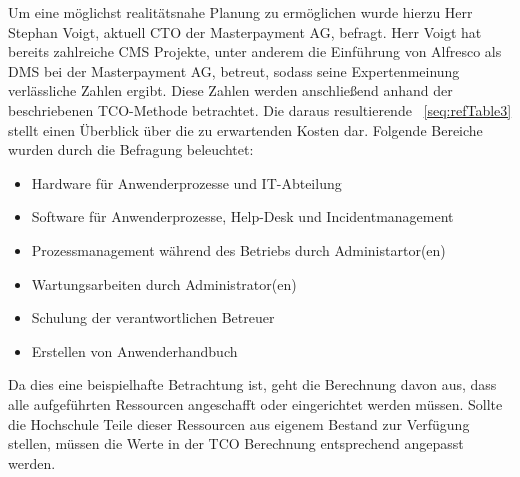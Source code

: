 \documentclass[a4paper]{article}
\newcommand\liststyleLSxvii{%
\renewcommand\labelitemi{${\bullet}$}
\renewcommand\labelitemii{${\circ}$}
\renewcommand\labelitemiii{${\blacksquare}$}
\renewcommand\labelitemiv{${\bullet}$}
}
\begin{document}
\bigskip

{\sffamily
Um eine möglichst realitätsnahe Planung zu ermöglichen wurde hierzu Herr Stephan Voigt, aktuell CTO der Masterpayment
AG, befragt. Herr Voigt hat bereits zahlreiche CMS Projekte, unter anderem die Einführung von Alfresco als DMS bei der
Masterpayment AG, betreut, sodass seine Expertenmeinung verlässliche Zahlen ergibt. Diese Zahlen werden anschließend
anhand der beschriebenen TCO-Methode betrachtet. Die daraus resultierende \tablename~\ref{seq:refTable3} stellt einen
Überblick über die zu erwartenden Kosten dar. Folgende Bereiche wurden durch die Befragung beleuchtet:}

\liststyleLSxvii
\begin{itemize}
\item {\sffamily
Hardware für Anwenderprozesse und IT-Abteilung}
\item {\sffamily
Software für Anwenderprozesse, Help-Desk und Incidentmanagement}
\item {\sffamily
Prozessmanagement während des Betriebs durch Administartor(en)}
\item {\sffamily
Wartungsarbeiten durch Administrator(en)}
\item {\sffamily
Schulung der verantwortlichen Betreuer}
\item {\sffamily
Erstellen von Anwenderhandbuch}
\end{itemize}
{\sffamily
Da dies eine beispielhafte Betrachtung ist, geht die Berechnung davon aus, dass alle aufgeführten Ressourcen angeschafft
oder eingerichtet werden müssen. Sollte die Hochschule Teile dieser Ressourcen aus eigenem Bestand zur Verfügung
stellen, müssen die Werte in der TCO Berechnung entsprechend angepasst werden.}


\bigskip
\end{document}
